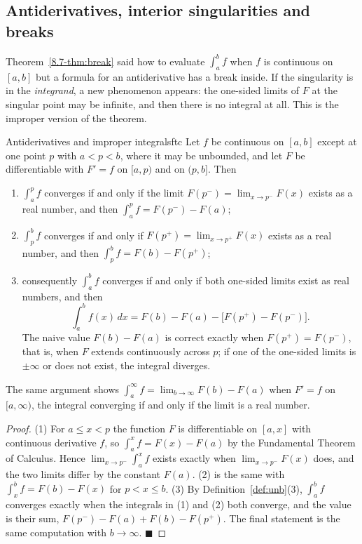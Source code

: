 \documentclass[11pt]{article}
\begin{document}
\subsection*{Antiderivatives, interior singularities and breaks}

Theorem~\ref{8.7-thm:break} said how to evaluate $\int_a^bf$ when $f$ is continuous on $[a,b]$ but a formula for an antiderivative has a break inside. If the singularity is in the \emph{integrand}, a new phenomenon appears: the one-sided limits of $F$ at the singular point may be infinite, and then there is no integral at all. This is the improper version of the theorem.

\begin{thm}{Antiderivatives and improper integrals}{ftc}
Let $f$ be continuous on $[a,b]$ except at one point $p$ with $a<p<b$, where it may be unbounded, and let $F$ be differentiable with $F'=f$ on $[a,p)$ and on $(p,b]$. Then
\begin{enumerate}[label=(\arabic*),leftmargin=*]
  \item $\int_a^pf$ converges if and only if the limit $F(p^-)=\lim_{x\to p^-}F(x)$ exists as a real number, and then $\int_a^pf=F(p^-)-F(a)$;
  \item $\int_p^bf$ converges if and only if $F(p^+)=\lim_{x\to p^+}F(x)$ exists as a real number, and then $\int_p^bf=F(b)-F(p^+)$;
  \item consequently $\int_a^bf$ converges if and only if both one-sided limits exist as real numbers, and then
  \[\int_a^bf(x)\,dx=F(b)-F(a)-\big[F(p^+)-F(p^-)\big].\]
  The naive value $F(b)-F(a)$ is correct exactly when $F(p^+)=F(p^-)$, that is, when $F$ extends continuously across $p$; if one of the one-sided limits is $\pm\infty$ or does not exist, the integral diverges.
\end{enumerate}
The same argument shows $\int_a^\infty f=\lim_{b\to\infty}F(b)-F(a)$ when $F'=f$ on $[a,\infty)$, the integral converging if and only if the limit is a real number.
\end{thm}
\begin{proof}
(1) For $a\le x<p$ the function $F$ is differentiable on $[a,x]$ with continuous derivative $f$, so $\int_a^xf=F(x)-F(a)$ by the Fundamental Theorem of Calculus. Hence $\lim_{x\to p^-}\int_a^xf$ exists exactly when $\lim_{x\to p^-}F(x)$ does, and the two limits differ by the constant $F(a)$. (2) is the same with $\int_x^bf=F(b)-F(x)$ for $p<x\le b$. (3) By Definition~\ref{def:unb}(3), $\int_a^bf$ converges exactly when the integrals in (1) and (2) both converge, and the value is their sum, $F(p^-)-F(a)+F(b)-F(p^+)$. The final statement is the same computation with $b\to\infty$. $\blacksquare$
\end{proof}
\end{document}
